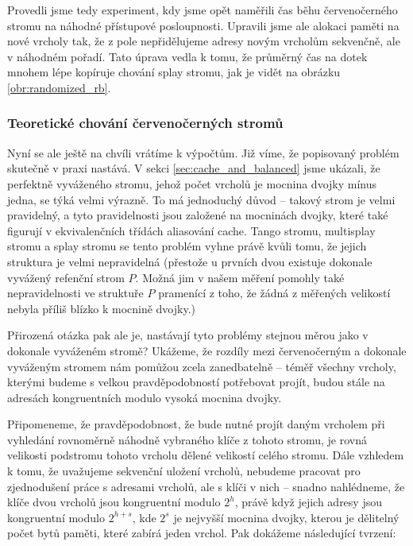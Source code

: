 Provedli jsme tedy experiment, kdy jsme opět naměřili čas běhu červenočerného stromu na náhodné přístupové posloupnosti. Upravili jsme ale alokaci paměti na nové vrcholy tak, že z pole nepřidělujeme adresy novým vrcholům sekvenčně, ale v náhodném pořadí. Tato úprava vedla k tomu, že průměrný čas na dotek mnohem lépe kopíruje chování splay stromu, jak je vidět na obrázku \ref{obr:randomized_rb}.


\subsubsection{Teoretické chování červenočerných stromů}

Nyní se ale ještě na chvíli vrátíme k výpočtům. Již víme, že popisovaný problém
skutečně v praxi nastává. V sekci \ref{sec:cache_and_balanced} jsme ukázali, že
perfektně vyváženého stromu, jehož počet vrcholů je mocnina dvojky mínus jedna,
se týká velmi výrazně. To má jednoduchý důvod -- takový strom je velmi
pravidelný, a tyto pravidelnosti jsou založené na mocninách dvojky, které také
figurují v ekvivalenčních třídách aliasování cache. Tango stromu, multisplay
stromu a splay stromu se tento problém vyhne právě kvůli tomu, že jejich
struktura je velmi nepravidelná (přestože u prvních dvou existuje dokonale
vyvážený refenční strom $P$. Možná jim v našem měření pomohly také
nepravidelnosti ve struktuře $P$ pramenící z toho, že žádná z měřených
velikostí nebyla příliš blízko k mocnině dvojky.)

Přirozená otázka pak ale je, nastávají tyto problémy stejnou měrou jako v
dokonale vyváženém stromě? Ukážeme, že rozdíly mezi červenočerným a dokonale
vyváženým stromem nám pomůžou zcela zanedbatelně -- téměř všechny vrcholy,
kterými budeme s velkou pravděpodobností potřebovat projít, budou stále na
adresách kongruentních modulo vysoká mocnina dvojky. 

Připomeneme, že
pravděpodobnost, že bude nutné projít daným vrcholem při vyhledání rovnoměrně náhodně vybraného klíče z tohoto stromu, je rovná velikosti
podstromu tohoto vrcholu dělené velikostí celého stromu. Dále vzhledem k tomu,
že uvažujeme sekvenční uložení vrcholů, nebudeme pracovat pro zjednodušení
práce s adresami vrcholů, ale s klíči v nich -- snadno nahlédneme, že klíče
dvou vrcholů jsou kongruentní modulo $2^h$, právě když jejich adresy jsou
kongruentní modulo $2^{h+s}$, kde $2^s$ je nejvyšší mocnina dvojky, kterou je
dělitelný počet bytů paměti, které zabírá jeden vrchol. Pak dokážeme
následující tvrzení:

